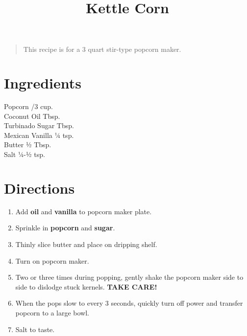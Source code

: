 \documentclass[11pt,letterpaper]{article}
\title{Kettle Corn}
\author{}
\date{}
\begin{document}
\maketitle
\thispagestyle{empty}

\begin{quote}
\small
\begin{em}
This recipe is for a 3 quart stir-type popcorn maker.
\end{em}
\end{quote}

\section*{Ingredients}
\setlength{\columnsep}{20pt}
\begin{multicols}{2}
\noindent
    Popcorn /3 cup. \\
	Coconut Oil  Tbsp. \\
	Turbinado Sugar  Tbsp. \\
	Mexican Vanilla \dotfill ¼ tsp. \\
	Butter \dotfill ½ Tbsp. \\
	Salt \dotfill ¼-½ tsp.
\end{multicols}

\section*{Directions}

\begin{enumerate}
	\item Add \textbf{oil} and \textbf{vanilla} to popcorn maker plate.
	\item Sprinkle in \textbf{popcorn} and \textbf{sugar}.
	\item Thinly slice butter and place on dripping shelf.
	\item Turn on popcorn maker.
	\item Two or three times during popping, gently shake the popcorn maker side to side to dislodge stuck kernels. \textbf{TAKE CARE!}
	\item When the pops slow to every 3 seconds, quickly turn off power and transfer popcorn to a large bowl.
	\item Salt to taste.
\end{enumerate}
\end{document}
